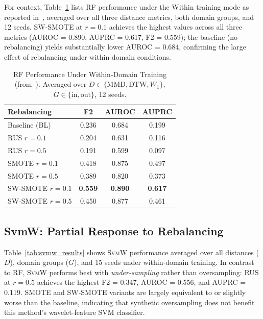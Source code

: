 \documentclass[lettersize,journal]{IEEEtran}
\newcommand{\Impl}[1]{\textsc{#1}}
\begin{document}
For context, Table~\ref{tab:rf_reference} lists RF performance under the Within training mode as reported in~\cite{nakagama2026tiv}, averaged over all three distance metrics, both domain groups, and 12 seeds.
SW-SMOTE at $r = 0.1$ achieves the highest values across all three metrics (AUROC = 0.890, AUPRC = 0.617, F2 = 0.559); the baseline (no rebalancing) yields substantially lower AUROC = 0.684, confirming the large effect of rebalancing under within-domain conditions.

\begin{table}[!t]
\caption{RF Performance Under Within-Domain Training (from~\cite{nakagama2026tiv}). Averaged over $D \in \{\mathrm{MMD, DTW}, W_1\}$, $G \in \{\mathrm{in, out}\}$, 12 seeds.\label{tab:rf_reference}}
\centering
\footnotesize
\begin{tabular}{|l|c|c|c|}
\hline
Rebalancing & F2 & AUROC & AUPRC \\
\hline
Baseline (BL) & 0.236 & 0.684 & 0.199 \\
\hline
RUS $r\!=\!0.1$ & 0.204 & 0.631 & 0.116 \\
RUS $r\!=\!0.5$ & 0.191 & 0.599 & 0.097 \\
\hline
SMOTE $r\!=\!0.1$ & 0.418 & 0.875 & 0.497 \\
SMOTE $r\!=\!0.5$ & 0.389 & 0.820 & 0.373 \\
\hline
SW-SMOTE $r\!=\!0.1$ & \textbf{0.559} & \textbf{0.890} & \textbf{0.617} \\
SW-SMOTE $r\!=\!0.5$ & 0.450 & 0.877 & 0.461 \\
\hline
\end{tabular}
\end{table}

\subsection{SvmW: Partial Response to Rebalancing}
\label{sec:svmw_results}

Table~\ref{tab:svmw_results} shows \Impl{SvmW} performance averaged over all distances ($D$), domain groups ($G$), and 15 seeds under within-domain training.
In contrast to RF, \Impl{SvmW} performs best with \emph{under-sampling} rather than oversampling: RUS at $r = 0.5$ achieves the highest F2 = 0.347, AUROC = 0.556, and AUPRC = 0.119.
SMOTE and SW-SMOTE variants are largely equivalent to or slightly worse than the baseline, indicating that synthetic oversampling does not benefit this method's wavelet-feature SVM classifier.
\end{document}
